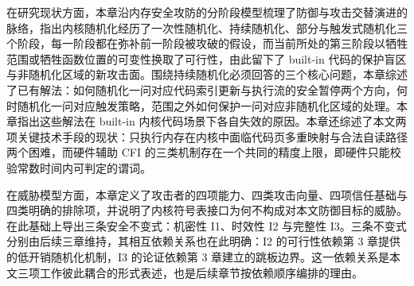 在研究现状方面，本章沿内存安全攻防的分阶段模型梳理了防御与攻击交替演进的脉络，指出内核随机化经历了一次性随机化、持续随机化、部分与触发式随机化三个阶段，每一阶段都在弥补前一阶段被攻破的假设，而当前所处的第三阶段以牺牲范围或牺牲函数位置的可变性换取了可行性，由此留下了 built-in 代码的保护盲区与非随机化区域的新攻击面。围绕持续随机化必须回答的三个核心问题，本章综述了已有解法：如何随机化一问对应代码索引更新与执行流的安全暂停两个方向，何时随机化一问对应触发策略，范围之外如何保护一问对应非随机化区域的处理。本章指出这些解法在 built-in 内核代码场景下各自失效的原因。本章还综述了本文两项关键技术手段的现状：只执行内存在内核中面临代码页多重映射与合法自读路径两个困难，而硬件辅助 CFI 的三类机制存在一个共同的精度上限，即硬件只能校验常数时间内可判定的谓词。

在威胁模型方面，本章定义了攻击者的四项能力、四类攻击向量、四项信任基础与四类明确的排除项，并说明了内核符号表接口为何不构成对本文防御目标的威胁。在此基础上导出三条安全不变式：机密性 I1、时效性 I2 与完整性 I3。三条不变式分别由后续三章维持，其相互依赖关系也在此明确：I2 的可行性依赖第 3 章提供的低开销随机化机制，I3 的论证依赖第 3 章建立的跳板边界。这一依赖关系是本文三项工作彼此耦合的形式表述，也是后续章节按依赖顺序编排的理由。

